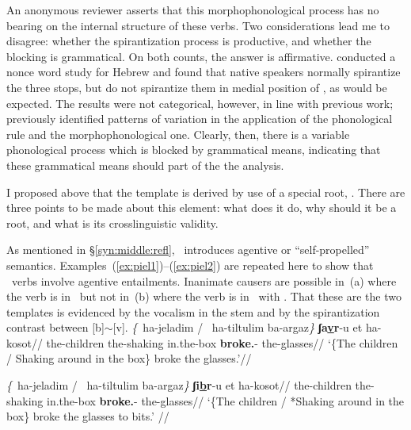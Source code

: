 An anonymous reviewer asserts that this morphophonological process has no bearing on the internal structure of these verbs. Two considerations lead me to disagree: whether the spirantization process is productive, and whether the blocking is grammatical. On both counts, the answer is affirmative. \cite{temkinmartinzemuellner16} conducted a nonce word study for Hebrew and found that native speakers normally spirantize the three stops, but do not spirantize them in medial position of {\tpie}, as would be expected. The results were not categorical, however, in line with previous work; \cite{adam02} previously identified patterns of variation in the application of the phonological rule and the morphophonological one. Clearly, then, there is a variable phonological process which is blocked by grammatical means, indicating that these grammatical means should part of the the analysis.




I proposed above that the template {\tpie} is derived by use of a special root, \va. There are three points to be made about this element: what does it do, why should it be a root, and what is its crosslinguistic validity.

As mentioned in \S\ref{syn:middle:refl}, \va~introduces agentive or ``self-propelled'' \citep{folliharley08} semantics. Examples~(\ref{ex:piel1})--(\ref{ex:piel2}) are repeated here to show that \tpie~verbs involve agentive entailments. Inanimate causers are possible in~(\nextx a) where the verb is in \tkal~but not in~(\nextx b) where the verb is in \tpie~with \va. That these are the two templates is evidenced by the vocalism in the stem and by the spirantization contrast between [b]$\sim$[v].
\pex
	\a \begingl
		\gla \emph{\{}\cmark~ha-jeladim / \cmark~ha-tiltulim ba-argaz\emph{\}} \textbf{ʃa\underline{v}r}-u et ha-kosot//
		\glb \phantom{\{\cmark~}the-children {} \phantom{\cmark~}the-shaking in.the-box \textbf{broke.}-  the-glasses//
		\glft `\{The children / Shaking around in the box\} broke the glasses.'//
		\endgl
	
	\a \begingl
		\gla \emph{\{}\cmark~ha-jeladim / \xmark~ha-tiltulim ba-argaz\emph{\}} \textbf{ʃi\underline{b}r}-u et ha-kosot//
		\glb \phantom{\{\cmark~}the-children {} \phantom{\xmark~}the-shaking in.the-box \textbf{broke.}-  the-glasses//
		\glft `\{The children / *Shaking around in the box\} broke the glasses to bits.' //
		\endgl
\xe

